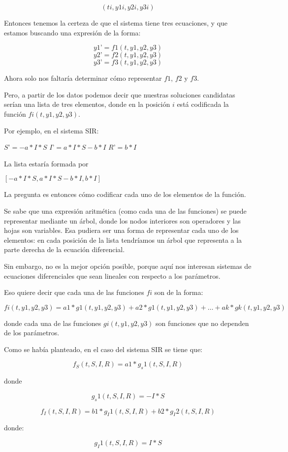 $$(ti, y1i, y2i, y3i)$$

Entonces tenemos la certeza de que el sistema tiene tres ecuaciones, y que estamos buscando una expresión de la forma:

$$y1’ = f1(t, y1, y2, y3)$$
$$y2’ = f2(t, y1, y2, y3)$$
$$y3’ = f3(t, y1, y2, y3)$$

Ahora solo nos faltaría determinar cómo representar $f1$, $f2$ y $f3$.

Pero, a partir de los datos podemos decir que nuestras soluciones candidatas serían una lista de tres elementos, donde en la posición $i$ está codificada la función $fi(t,y1,y2,y3)$.

Por ejemplo, en el sistema SIR:

$S’ = - a*I*S$
$I’ = a*I*S - b*I $
$R’ = b*I$

La lista estaría formada por

$[-a*I*S, a*I*S - b*I, b*I]$

La pregunta es entonces cómo codificar cada uno de los elementos de la función.

Se sabe que una expresión aritmética (como cada una de las funciones) se puede representar mediante un árbol, donde los nodos interiores son operadores y las hojas son variables.  Esa pudiera ser una forma de representar cada uno de los elementos: en cada posición de la lista tendríamos un árbol que representa a la parte derecha de la ecuación diferencial.

Sin embargo, no es la mejor opción posible, porque aquí nos interesan sistemas de ecuaciones diferenciales que sean lineales con respecto a los parámetros.

Eso quiere decir que cada una de las funciones $fi$ son de la forma:

$$fi (t, y1, y2, y3) = a1 * g1(t, y1, y2, y3) + a2 * g1(t, y1, y2, y3) + … + ak * gk(t, y1, y2, y3)$$

donde cada una de las funciones $gi(t,y1,y2,y3)$ son funciones que no dependen de los parámetros.

Como se había planteado, en el caso del sistema SIR se tiene que:

$$f_S (t,S,I,R) = a1 * g_s1 (t,S,I,R)$$

donde

$$g_s1(t,S,I,R) = -I*S$$

$$f_I (t,S,I,R) = b1 * g_I1 (t,S,I,R) + b2 * g_I2 (t,S,I,R)$$

donde:

$$g_I1(t,S,I,R) = I*S$$

